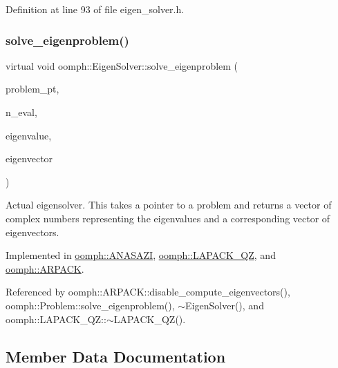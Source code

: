 Definition at line 93 of file eigen\+\_\+solver.\+h.

\mbox{\label{classoomph_1_1EigenSolver_a6a6b09612ce16457b26fa0cfe996fa71}} 
\subsubsection{\texorpdfstring{solve\+\_\+eigenproblem()}{solve\_eigenproblem()}}
{\footnotesize\ttfamily virtual void oomph\+::\+Eigen\+Solver\+::solve\+\_\+eigenproblem (\begin{DoxyParamCaption}\item[{\hyperlink{classoomph_1_1Problem}{Problem} $\ast$const \&}]{problem\+\_\+pt,  }\item[{const int \&}]{n\+\_\+eval,  }\item[{\hyperlink{classoomph_1_1Vector}{Vector}$<$ std\+::complex$<$ double $>$ $>$ \&}]{eigenvalue,  }\item[{\hyperlink{classoomph_1_1Vector}{Vector}$<$ \hyperlink{classoomph_1_1DoubleVector}{Double\+Vector} $>$ \&}]{eigenvector }\end{DoxyParamCaption})\hspace{0.3cm}{\ttfamily [pure virtual]}}



Actual eigensolver. This takes a pointer to a problem and returns a vector of complex numbers representing the eigenvalues and a corresponding vector of eigenvectors. 



Implemented in \hyperlink{classoomph_1_1ANASAZI_a5b13a2a77a422033c6a522ec68549fa5}{oomph\+::\+A\+N\+A\+S\+A\+ZI}, \hyperlink{classoomph_1_1LAPACK__QZ_ae1efb27c494ea6fb0ce1267233c78f74}{oomph\+::\+L\+A\+P\+A\+C\+K\+\_\+\+QZ}, and \hyperlink{classoomph_1_1ARPACK_ac644213623ea3d91a42cf1ea4608cdf3}{oomph\+::\+A\+R\+P\+A\+CK}.



Referenced by oomph\+::\+A\+R\+P\+A\+C\+K\+::disable\+\_\+compute\+\_\+eigenvectors(), oomph\+::\+Problem\+::solve\+\_\+eigenproblem(), $\sim$\+Eigen\+Solver(), and oomph\+::\+L\+A\+P\+A\+C\+K\+\_\+\+Q\+Z\+::$\sim$\+L\+A\+P\+A\+C\+K\+\_\+\+Q\+Z().



\subsection{Member Data Documentation}
\mbox{\label{classoomph_1_1EigenSolver_ab0ead9f50f12f8d6acf9be4521de95a1}} 
